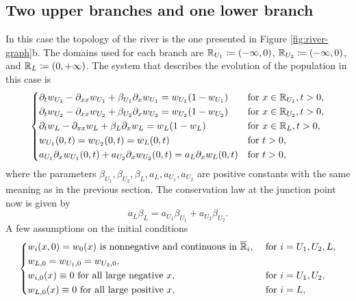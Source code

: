 \subsection{Two upper branches and one lower branch}
In this case the topology of the river is the one presented in Figure \ref{fig:river-graph}b. The domains used for each branch are \(\mathbb{R}_{U_1} \coloneqq (-\infty, 0)\), \(\mathbb{R}_{U_2} \coloneqq (-\infty, 0)\), and \(\mathbb{R}_L \coloneqq (0, +\infty)\). The system that describes the evolution of the population in this case is
\begin{equation}
    \begin{dcases}
        \partial_t w_{U_1} - \partial_{xx}w_{U_1} + \beta_{U_1} \partial_x w_{U_1} = w_{U_1}(1 - w_{U_1}) & \text{for } x \in \mathbb{R}_{U_1}, t > 0, \\
        \partial_t w_{U_2} - \partial_{xx}w_{U_2} + \beta_{U_2} \partial_x w_{U_2} = w_{U_2}(1 - w_{U_2}) & \text{for } x \in \mathbb{R}_{U_2}, t > 0, \\
        \partial_t w_L - \partial_{xx}w_L + \beta_L \partial_x w_L = w_L(1 - w_L) & \text{for } x \in \mathbb{R}_L, t > 0, \\
        w_{U_1}(0, t) = w_{U_2}(0, t) = w_L(0, t) & \text{for } t > 0, \\
        a_{U_1} \partial_x w_{U_1}(0, t) + a_{U_2} \partial_x w_{U_2}(0, t) = a_L \partial_x w_L(0, t) & \text{for } t > 0, \\
    \end{dcases}
    \label{eq:1.11}
\end{equation}
where the parameters \(\beta_{U_1}, \beta_{U_2}, \beta_L, a_L, a_{U_1}, a_{U_2}\) are positive constants with the same meaning as in the previous section. The conservation law at the junction point now is given by
\begin{equation}
    a_L \beta_L = a_{U_1} \beta_{U_1} + a_{U_2} \beta_{U_2}.
    \label{eq:1.12}
\end{equation}
A few assumptions on the initial conditions
\begin{equation}
    \begin{dcases}
        w_i(x, 0) = w_0(x) \text{ is nonnegative and continuous in } \overline{\mathbb{R}}_i, & \text{ for } i = U_1, U_2, L, \\
        w_{L,0} = w_{U_1,0} = w_{U_2,0}, \\
        w_{i,0}(x) \equiv 0 \text{ for all large negative } x, & \text{ for } i = U_1, U_2, \\
        w_{L,0}(x) \equiv 0 \text{ for all large positive } x, & \text{ for } i = L,
    \end{dcases}
    \label{eq:1.13}
\end{equation}

